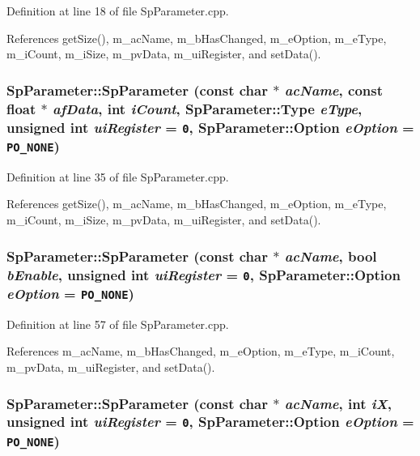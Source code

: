Definition at line 18 of file Sp\-Parameter.cpp.

References get\-Size(), m\_\-ac\-Name, m\_\-b\-Has\-Changed, m\_\-e\-Option, m\_\-e\-Type, m\_\-i\-Count, m\_\-i\-Size, m\_\-pv\-Data, m\_\-ui\-Register, and set\-Data().
\subsubsection{\setlength{\rightskip}{0pt plus 5cm}Sp\-Parameter::Sp\-Parameter (const char $\ast$ {\em ac\-Name}, const float $\ast$ {\em af\-Data}, int {\em i\-Count}, {\bf Sp\-Parameter::Type} {\em e\-Type}, unsigned int {\em ui\-Register} = {\tt 0}, {\bf Sp\-Parameter::Option} {\em e\-Option} = {\tt PO\_\-NONE})}\label{classSpark_1_1SpParameter_a2}


Definition at line 35 of file Sp\-Parameter.cpp.

References get\-Size(), m\_\-ac\-Name, m\_\-b\-Has\-Changed, m\_\-e\-Option, m\_\-e\-Type, m\_\-i\-Count, m\_\-i\-Size, m\_\-pv\-Data, m\_\-ui\-Register, and set\-Data().
\subsubsection{\setlength{\rightskip}{0pt plus 5cm}Sp\-Parameter::Sp\-Parameter (const char $\ast$ {\em ac\-Name}, bool {\em b\-Enable}, unsigned int {\em ui\-Register} = {\tt 0}, {\bf Sp\-Parameter::Option} {\em e\-Option} = {\tt PO\_\-NONE})}\label{classSpark_1_1SpParameter_a3}


Definition at line 57 of file Sp\-Parameter.cpp.

References m\_\-ac\-Name, m\_\-b\-Has\-Changed, m\_\-e\-Option, m\_\-e\-Type, m\_\-i\-Count, m\_\-pv\-Data, m\_\-ui\-Register, and set\-Data().
\subsubsection{\setlength{\rightskip}{0pt plus 5cm}Sp\-Parameter::Sp\-Parameter (const char $\ast$ {\em ac\-Name}, int {\em i\-X}, unsigned int {\em ui\-Register} = {\tt 0}, {\bf Sp\-Parameter::Option} {\em e\-Option} = {\tt PO\_\-NONE})}\label{classSpark_1_1SpParameter_a4}


